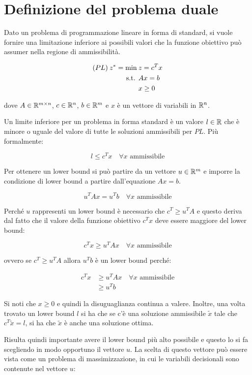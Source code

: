 
\section{Definizione del problema duale}

Dato un problema di programmazione lineare in forma di standard, si vuole fornire una limitazione inferiore ai possibili valori che la funzione obiettivo può assumer nella regione di ammissibilità.

\begin{align*}
(PL)\:z^* = \min \:& z=c^Tx \\
\text{s.t. }& Ax=b \\
&x\geq 0
\end{align*}

dove $A \in \mathbb{R}^{m \times n}$, $c \in \mathbb{R}^n$, $b \in \mathbb{R}^m$ e $x$ è un vettore di variabili in $\mathbb{R}^n$.

Un limite inferiore per un problema in forma standard è un valore $l \in \mathbb{R}$ che è minore o uguale del valore di tutte le soluzioni ammissibili per $PL$.
Più formalmente:

$$
l \leq c^T x \quad \forall x \text{ ammissibile}
$$

Per ottenere un lower bound  si può partire da un vettore $u \in \mathbb{R}^m$ e imporre la condizione di lower bound a partire dall'equazione $Ax = b$.

$$
u^TAx= u^Tb \quad\forall x \text{ ammissibile}
$$

Perché $u$ rappresenti un lower bound è necessario che $c^T \geq u^TA $ e questo deriva dal fatto che il valore della funzione obiettivo $c^Tx$ deve essere maggiore del lower bound:

$$
c^T x \geq u^TAx \quad\forall x \text{ ammissibile}
$$

ovvero se $c^T \geq u^TA$ allora $u^Tb$ è un lower bound perché:

\begin{align}
c^T x &\geq u^TAx \quad\forall x \text{ ammissibile} \\
	&\geq u^Tb
\end{align}

Si noti che $x\geq0$ e quindi la disuguaglianza continua a valere.
Inoltre, una volta trovato un lower bound $l$ si ha che se c'è una soluzione ammissibile $\tilde{x}$ tale che $c^T\tilde{x} = l$, si ha che $\tilde{x}$ è anche una soluzione ottima.

Risulta quindi importante avere il lower bound più alto possibile e questo lo si fa scegliendo in modo opportuno il vettore $u$.
La scelta di questo vettore può essere vista come un problema di massimizzazione, in cui le variabili decisionali sono contenute nel vettore $u$:

